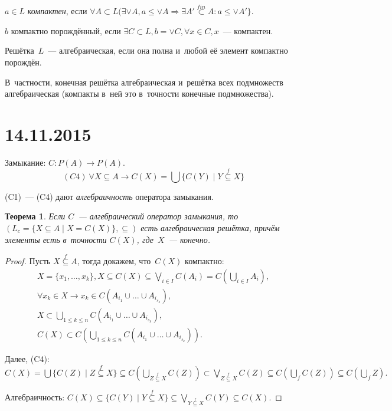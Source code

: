\documentclass{article}
\newtheorem{theorem}{Теорема}
\renewcommand{\le}{\leqslant}
\begin{document}
$a \in L$ \emph{компактен}, если $\forall A \subset L (\exists \vee A, a \le
\vee A \Rightarrow \exists A' \overset{fin} \subset A: a \le \vee A' \}$.

$b$ компактно порождённый, если $\exists C \subset L, b = \vee C, \forall x \in
C, x$~--- компактен.

Решётка~$L$~--- алгебраическая, если она полна и~любой её элемент компактно
порождён.

В~частности, конечная решётка алгебраическая и~решётка всех подмножеств
алгебраическая (компакты в~ней это в~точности конечные подмножества).

\section*{14.11.2015}

Замыкание: $C: P(A) \rightarrow P(A)$.
$$ (C4)~\forall X \subseteq A \rightarrow C(X) = \bigcup \{ C(Y) \mid Y
\overset{f} \subseteq X \} $$

(C1)~--- (C4) дают \emph{алгебраичность} оператора замыкания.

\begin{theorem}
  Если $C$~--- алгебраический оператор замыкания, то $(L_c = \{ X \subseteq A
  \mid X = C(X) \}, \subseteq)$ есть алгебраическая решётка, причём элементы
  есть в~точности $C(X)$, где~$X$~--- конечно.
\end{theorem}
\begin{proof}
  Пусть $X \overset{f}\subseteq A$, тогда докажем, что~$C(X)$ компактно:
  \begin{gather*}
    X = \{x_1, \ldots, x_k \}, X \subseteq C(X) \subseteq \bigvee\limits_{i\in
    I} C(A_i) = C(\bigcup\limits_{i\in I}A_i),\\
    \forall x_k \in X \rightarrow x_k \in C(A_{i_1} \cup \ldots \cup
    A_{i_{s_k}}),\\
    X \subset \bigcup\limits_{1 \le k \le n} C(A_{i_1} \cup \ldots
    \cup A_{i_{s_k}}),\\
    C(X) \subset C(\bigcup\limits_{1 \le k \le n} C(A_{i_1} \cup \ldots
    \cup A_{i_{s_k}})).
  \end{gather*}

  Далее, (C4): $C(X) = \bigcup\{C(Z) \mid Z \overset{f}\subseteq X\} \subseteq
  C(\bigcup\limits_{Z\overset{f}\subseteq X} C(Z)) \subset \bigvee\limits_{Z
  \overset{f}\subseteq X} C(Z) \subseteq C(\bigcup_f C(Z)) \subseteq C(\bigcup_f
  Z).$

  Алгебраичность: $C(X) \subseteq\{ C(Y) \mid Y \overset{f}\subseteq X \}
  \subseteq \bigvee\limits_{Y \overset{f}\subseteq X} C(Y) \subseteq C(X)$.
\end{proof}
\end{document}
